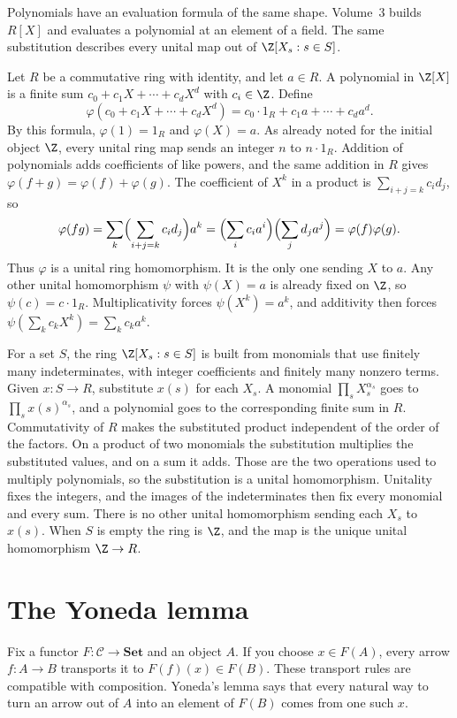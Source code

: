 Polynomials have an evaluation formula of the same shape. Volume~3 builds $R[X]$ and evaluates a polynomial at an element of a field. The same substitution describes every unital map out of $\Z[X_s:s\in S]$.

Let $R$ be a commutative ring with identity, and let $a\in R$. A polynomial in $\Z[X]$ is a finite sum $c_0+c_1X+\cdots+c_dX^d$ with $c_i\in\Z$. Define
\[
\varphi(c_0+c_1X+\cdots+c_dX^d)=c_0\cdot 1_R+c_1a+\cdots+c_da^d.
\]
By this formula, $\varphi(1)=1_R$ and $\varphi(X)=a$. As already noted for the initial object $\Z$, every unital ring map sends an integer $n$ to $n\cdot 1_R$. Addition of polynomials adds coefficients of like powers, and the same addition in $R$ gives $\varphi(f+g)=\varphi(f)+\varphi(g)$. The coefficient of $X^k$ in a product is $\sum_{i+j=k}c_id_j$, so
\[
\varphi(fg)=\sum_k\Bigl(\sum_{i+j=k}c_id_j\Bigr)a^k
=\Bigl(\sum_ic_ia^i\Bigr)\Bigl(\sum_jd_ja^j\Bigr)=\varphi(f)\varphi(g).
\]
Thus $\varphi$ is a unital ring homomorphism. It is the only one sending $X$ to $a$. Any other unital homomorphism $\psi$ with $\psi(X)=a$ is already fixed on $\Z$, so $\psi(c)=c\cdot 1_R$. Multiplicativity forces $\psi(X^k)=a^k$, and additivity then forces $\psi(\sum_k c_kX^k)=\sum_k c_ka^k$.

For a set $S$, the ring $\Z[X_s:s\in S]$ is built from monomials that use finitely many indeterminates, with integer coefficients and finitely many nonzero terms. Given $x:S\to R$, substitute $x(s)$ for each $X_s$. A monomial $\prod_s X_s^{\alpha_s}$ goes to $\prod_s x(s)^{\alpha_s}$, and a polynomial goes to the corresponding finite sum in $R$. Commutativity of $R$ makes the substituted product independent of the order of the factors. On a product of two monomials the substitution multiplies the substituted values, and on a sum it adds. Those are the two operations used to multiply polynomials, so the substitution is a unital homomorphism. Unitality fixes the integers, and the images of the indeterminates then fix every monomial and every sum. There is no other unital homomorphism sending each $X_s$ to $x(s)$. When $S$ is empty the ring is $\Z$, and the map is the unique unital homomorphism $\Z\to R$.

\section{The Yoneda lemma}

Fix a functor $F:\mathcal C\to\mathbf{Set}$ and an object $A$. If you choose $x\in F(A)$, every arrow $f:A\to B$ transports it to $F(f)(x)\in F(B)$. These transport rules are compatible with composition. Yoneda's lemma says that every natural way to turn an arrow out of $A$ into an element of $F(B)$ comes from one such $x$.

